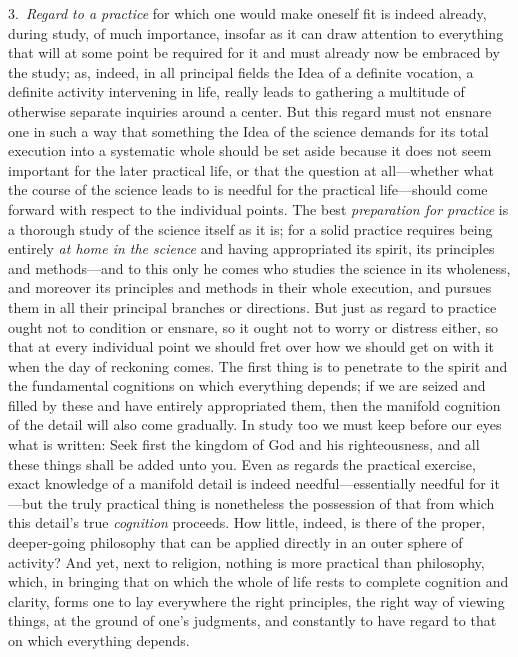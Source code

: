 \documentclass[12pt,a4paper]{book}
\begin{document}
3.~\emph{Regard to a practice} for which one would make oneself fit is indeed already,
during study, of much importance, insofar as it can draw attention to everything that
will at some point be required for it and must already now be embraced by the study; as,
indeed, in all principal fields the Idea of a definite vocation, a definite activity
intervening in life, really leads to gathering a multitude of otherwise separate
inquiries around a center. But this regard must not ensnare one in such a way that
something the Idea of the science demands for its total execution into a systematic whole
should be set aside because it does not seem important for the later practical life, or
that the question at all---whether what the course of the science leads to is needful for
the practical life---should come forward with respect to the individual points. The best
\emph{preparation for practice} is a thorough study of the science itself as it is; for
a solid practice requires being entirely \emph{at home in the science} and having
appropriated its spirit, its principles and methods---and to this only he comes who
studies the science in its wholeness, and moreover its principles and methods in their
whole execution, and pursues them in all their principal branches or directions. But
just as regard to practice ought not to condition or ensnare, so it ought not to worry
or distress either, so that at every individual point we should fret over how we should
get on with it when the day of reckoning comes. The first thing is to penetrate to the
spirit and the fundamental cognitions on which everything depends; if we are seized and
filled by these and have entirely appropriated them, then the manifold cognition of the
detail will also come gradually. In study too we must keep before our eyes what is
written: Seek first the kingdom of God and his righteousness, and all these things shall
be added unto you. Even as regards the practical exercise, exact knowledge of a manifold
detail is indeed needful---essentially needful for it---but the truly practical thing is
nonetheless the possession of that from which this detail's true \emph{cognition}
proceeds. How little, indeed, is there of the proper, deeper-going philosophy that can be
applied directly in an outer sphere of activity? And yet, next to religion, nothing is
more practical than philosophy, which, in bringing that on which the whole of life rests
to complete cognition and clarity, forms one to lay everywhere the right principles, the
right way of viewing things, at the ground of one's judgments, and constantly to have
regard to that on which everything depends.
\end{document}
